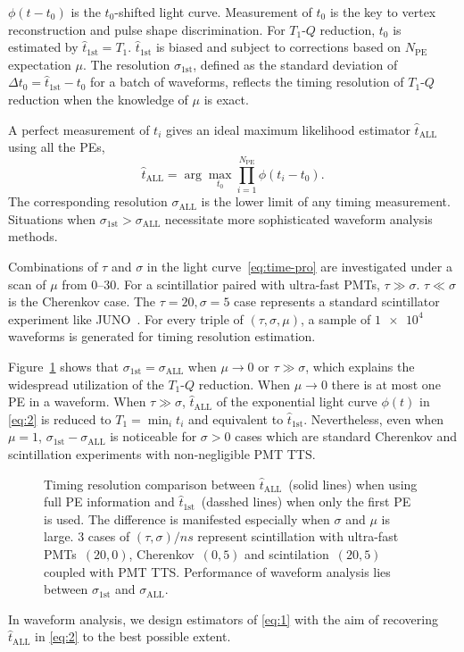 $\phi(t-t_0)$ is the $t_0$-shifted light curve. Measurement of $t_0$ is the key to vertex reconstruction and pulse shape discrimination.  For $T_1$-$Q$ reduction, $t_0$ is estimated by $\hat{t}_\mathrm{1st} = T_1$. $\hat{t}_\mathrm{1st}$ is biased and subject to corrections based on $N_\mathrm{PE}$ expectation $\mu$. The resolution $\sigma_\mathrm{1st}$, defined as the standard deviation of $\Delta t_0 = \hat{t}_\mathrm{1st} - t_0$ for a 
batch of waveforms, reflects the timing resolution of $T_1$-$Q$ reduction when the knowledge of $\mu$ is exact.

A perfect measurement of $t_i$ gives an ideal maximum likelihood estimator $\hat{t}_\mathrm{ALL}$ using all the PEs,
\begin{equation}
  \label{eq:2}
  \hat{t}_\mathrm{ALL} = \arg\underset{t_0}{\max} \prod_{i=1}^{N_\mathrm{PE}} \phi(t_i-t_0).
\end{equation}
The corresponding resolution $\sigma_\mathrm{ALL}$ is the lower limit of any timing measurement.  Situations when $\sigma_\mathrm{1st} > \sigma_\mathrm{ALL}$ necessitate more sophisticated waveform analysis methods.

Combinations of $\tau$ and $\sigma$ in the light curve~\eqref{eq:time-pro} are investigated under a scan of $\mu$ from \numrange{0}{30}. For a scintillatior paired with ultra-fast PMTs, $\tau \gg \sigma$.  $\tau \ll \sigma$ is the Cherenkov case.  The $\tau=20, \sigma=5$ case represents a standard scintillator experiment like JUNO~\cite{ludhova_particle_2020}.  For every triple of $(\tau, \sigma, \mu)$, a sample of $\num[retain-unity-mantissa=false]{1e4}$ waveforms is generated for timing resolution estimation.

Figure~\ref{fig:reso-diff} shows that $\sigma_{\mathrm{1st}}=\sigma_{\mathrm{ALL}}$ when $\mu \to 0$ or $\tau \gg \sigma$, which explains the widespread utilization of the $T_1$-$Q$ reduction.  When $\mu \to 0$ there is at most one PE in a waveform.  When $\tau \gg \sigma$, $\hat{t}_\mathrm{ALL}$ of the exponential light curve $\phi(t)$ in \eqref{eq:2} is reduced to $T_1 = \min_i t_i$ and equivalent to $\hat{t}_\mathrm{1st}$. Nevertheless, even when $\mu = 1$, $\sigma_{\mathrm{1st}} - \sigma_{\mathrm{ALL}}$ is noticeable for $\sigma > 0$ cases which are standard Cherenkov and scintillation experiments with non-negligible PMT TTS.
\begin{figure}[H]
  \centering
  \scalebox{0.63}{}
  \caption{\label{fig:reso-diff} Timing resolution comparison between $\hat{t}_{\mathrm{ALL}}$~(solid lines) when using full PE information and $\hat{t}_\mathrm{1st}$~(dasshed lines) when only the first PE is used.  The difference is manifested especially when $\sigma$ and $\mu$ is large.  3 cases of $(\tau, \sigma)/\si{ns}$ represent scintillation with ultra-fast PMTs~$(20,0)$, Cherenkov~$(0, 5)$ and scintilation~$(20, 5)$ coupled with PMT TTS. Performance of waveform analysis lies between $\sigma_{\mathrm{1st}}$ and $\sigma_{\mathrm{ALL}}$. }
\end{figure}

In waveform analysis, we design estimators of \eqref{eq:1} with the aim of recovering $\hat{t}_\mathrm{ALL}$ in \eqref{eq:2} to the best possible extent.
